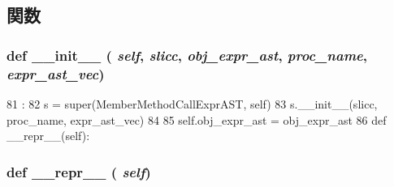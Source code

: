 \subsection{関数}
\hypertarget{classslicc_1_1ast_1_1MethodCallExprAST_1_1MemberMethodCallExprAST_ac775ee34451fdfa742b318538164070e}{
\subsubsection[{\_\-\_\-init\_\-\_\-}]{\setlength{\rightskip}{0pt plus 5cm}def \_\-\_\-init\_\-\_\- ( {\em self}, \/   {\em slicc}, \/   {\em obj\_\-expr\_\-ast}, \/   {\em proc\_\-name}, \/   {\em expr\_\-ast\_\-vec})}}
\label{classslicc_1_1ast_1_1MethodCallExprAST_1_1MemberMethodCallExprAST_ac775ee34451fdfa742b318538164070e}



\begin{DoxyCode}
81                                                                     :
82         s = super(MemberMethodCallExprAST, self)
83         s.__init__(slicc, proc_name, expr_ast_vec)
84 
85         self.obj_expr_ast = obj_expr_ast
86 
    def __repr__(self):
\end{DoxyCode}
\hypertarget{classslicc_1_1ast_1_1MethodCallExprAST_1_1MemberMethodCallExprAST_ad8b9328939df072e4740cd9a63189744}{
\subsubsection[{\_\-\_\-repr\_\-\_\-}]{\setlength{\rightskip}{0pt plus 5cm}def \_\-\_\-repr\_\-\_\- ( {\em self})}}
\label{classslicc_1_1ast_1_1MethodCallExprAST_1_1MemberMethodCallExprAST_ad8b9328939df072e4740cd9a63189744}



